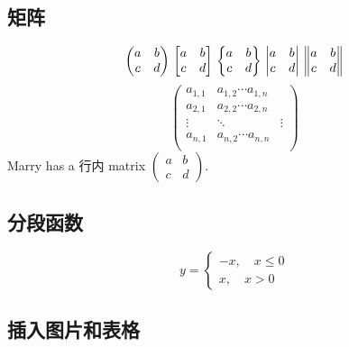 \documentclass[UTF8]{article}
\begin{document}
 \subsection{矩阵}
     \[ \begin{pmatrix}
             a & b \\c&d
         \end{pmatrix} \\
         \begin{bmatrix}
             a & b \\c&d
         \end{bmatrix} \\
         \begin{Bmatrix}
             a & b \\c&d
         \end{Bmatrix} \\
         \begin{vmatrix}
             a & b \\c&d
         \end{vmatrix} \\
         \begin{Vmatrix}
             a & b \\c&d
         \end{Vmatrix}
     \]
     \[ \begin{pmatrix}
             a_{1,1} & a_{1,2} \cdots a_{1,n}          \\
             a_{2,1} & a_{2,2} \cdots a_{2,n}          \\
             \vdots  & \ddots                 & \vdots \\
             a_{n,1} & a_{n,2} \cdots a_{n,n}          \\
         \end{pmatrix}
     \]
     Marry has a 行内 matrix $ ( \begin{smallmatrix} a&b\\c&d \end{smallmatrix} ) $.
 \subsection{分段函数}
     \[ y= \begin{cases}
             -x,\quad x\leq 0 \\
             x,\quad x>0
         \end{cases} \]
 \subsection{插入图片和表格}
\end{document}
